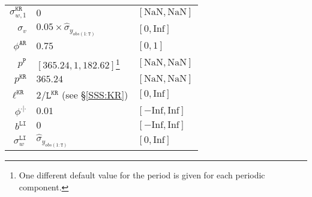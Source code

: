 \begin{table}[h!]
\begin{tabular}{r|ll}
$\sigma_{w,1}^{\mathtt{KR}}  $ &  $0$  &  $[\text{NaN},\text{NaN}]$ \\
$\sigma_{v}$ &  $0.05\times\hat{\sigma}_{y_{obs(1:\mathtt{T})}}$  &  $[0,\text{Inf}]$ \\
$\phi^{\mathtt{AR}} $ &  $0.75$ & $[0,1]$ \\
$p^{\mathtt{P}} $ &  $[365.24, 1, 182.62]$\footnote{One different default value for the period is given for each periodic component.} & $[\text{NaN},\text{NaN}]$ \\
$p^{\mathtt{KR}} $ &  $365.24$ & $[\text{NaN},\text{NaN}]$ \\
$\ell^{\mathtt{KR}} $ &  $2/\mathtt{L}^{\mathtt{KR}}$ (see \S\ref{SSS:KR})& $[0,\text{Inf}]$ \\
$\phi^{\cdot|\cdot} $ &  $0.01$  &  $[-\text{Inf}, \text{Inf}]$\\
$b^{\mathtt{LI}} $ &  $0$  &  $[-\text{Inf}, \text{Inf}]$\\
$\sigma_{w}^{\mathtt{LI}}$ &  $\hat{\sigma}_{y_{obs(1:\mathtt{T})}}$  &  $[0, \text{Inf}]$\\\bottomrule

\end{tabular}
\label{table:defaultparamreal}
\end{table}



